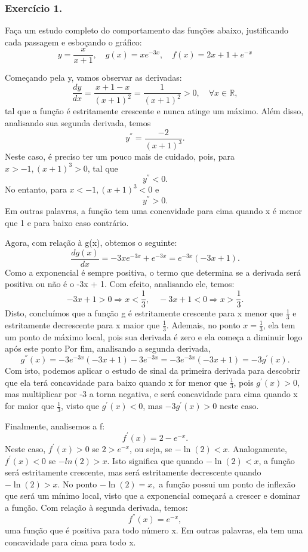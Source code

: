 \subsubsection{Exerc\'icio 1.}
Fa\c ca um estudo completo do comportamento das fun\c c\~oes abaixo, justificando
cada passagem e esbo\c cando o gr\'afico:
\begin{equation*}
	y = \frac{x}{x+1}, \quad g(x) = xe^{-3x}, \quad f(x) = 2x + 1 + e^{-x}
\end{equation*}
\begin{proof*}
	Come\c cando pela y, vamos observar as derivadas:
	\[
		\frac{dy}{dx}= \frac{x+1 - x}{(x+1)^{2}}= \frac{1}{(x+1)^{2}}> 0, \quad\forall x\in\mathbb{R},
	\]
	tal que a fun\c c\~ao \'e estritamente crescente e nunca atinge um m\'aximo. Al\'em
	disso, analisando sua segunda derivada, temos
	\[
		y^{''}= \frac{-2}{(x+1)^{3}}.
	\]
	Neste caso, \'e preciso ter um pouco mais de cuidado, pois, para $x > -1, (x+1)
	^{3} > 0$, tal que
	\[
		y^{''}< 0.
	\]
	No entanto, para $x < -1, (x + 1)^{3} < 0$ e
	\[
		y^{''}> 0.
	\]
	Em outras palavras, a fun\c c\~ao tem uma concavidade para cima quando x \'e
	menor que 1 e para baixo caso contr\'ario.

	Agora, com rela\c c\~ao \`a g(x), obtemos o seguinte:
	\[
		\frac{d g(x)}{dx}= -3xe^{-3x}+ e^{-3x}= e^{-3x}(-3x + 1).
	\]
	Como a exponencial \'e sempre positiva, o termo que determina se a derivada
	ser\'a positiva ou n\~ao \'e o -3x + 1. Com efeito, analisando ele, temos:
	\[
		-3x + 1 > 0 \Rightarrow x < \frac{1}{3}, \quad -3x + 1 < 0 \Rightarrow x > \frac{1}{3}.
	\]
	Disto, conclu\'imos que a fun\c c\~ao g \'e estritamente crescente para x
	menor que $\frac{1}{3}$ e estritamente decrescente para x maior que
	$\frac{1}{3}$. Ademais, no ponto $x = \frac{1}{3}$, ela tem um ponto de m\'aximo
	local, pois sua derivada \'e zero e ela come\c ca a diminuir logo ap\'os este
	ponto Por fim, analisando a segunda derivada,
	\[
		g^{''}(x) = -3e^{-3x}(-3x + 1) -3e^{-3x}= -3e^{-3x}(-3x + 1) = -3g^{'}(x).
	\]
	Com isto, podemos aplicar o estudo de sinal da primeira derivada para descobrir
	que ela ter\'a concavidade para baixo quando x for menor que $\frac{1}{3}$,
	pois $g^{'}(x) > 0$, mas multiplicar por -3 a torna negativa, e ser\'a concavidade
	para cima quando x for maior que $\frac{1}{3}$, visto que $g^{'}(x) < 0$, mas $-
	3g^{'}(x) > 0$ neste caso.

	Finalmente, analisemos a f:
	\[
		f^{'}(x) = 2 - e^{-x}.
	\]
	Neste caso, $f^{'}(x) > 0$ se $2 > e^{-x}$, ou seja, se $-\ln(2) < x$. Analogamente,
	$f^{'}(x) < 0$ se $-ln(2) > x$. Isto significa que quando $-\ln(2) < x$, a fun\c
	c\~ao ser\'a estritamente crescente, mas ser\'a estritamente decrescente
	quando $-\ln(2) > x.$ No ponto $-\ln(2) = x,$ a fun\c c\~ao possui um ponto de
	inflex\~ao que ser\'a um m\'inimo local, visto que a exponencial come\c car\'a
	a crescer e dominar a fun\c c\~ao. Com rela\c c\~ao \`a segunda derivada,
	temos:
	\[
		f^{''}(x) = e^{-x},
	\]
	uma fun\c c\~ao que \'e positiva para todo n\'umero x. Em outras palavras, ela
	tem uma concavidade para cima para todo x.


\end{proof*}
